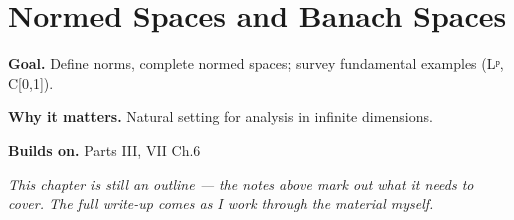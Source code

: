\chapter{Normed Spaces and Banach Spaces}
\label{ch:12-functional-analysis-and-spectral-theory-01}

\begin{chapterintro}
\textbf{Goal.} Define norms, complete normed spaces; survey fundamental examples (Lᵖ, C[0,1]).

\textbf{Why it matters.} Natural setting for analysis in infinite dimensions.

\textbf{Builds on.} Parts III, VII Ch.6
\end{chapterintro}

\textit{This chapter is still an outline --- the notes above mark out what it needs to cover. The full write-up comes as I work through the material myself.}

